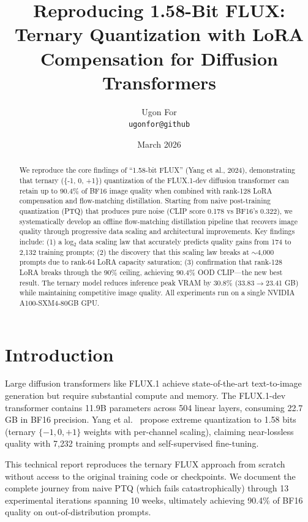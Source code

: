 \documentclass[10pt,twocolumn]{article}
\title{\textbf{Reproducing 1.58-Bit FLUX: Ternary Quantization with LoRA Compensation for Diffusion Transformers}}
\author{
  Ugon For \\
  \texttt{ugonfor@github}
}
\date{March 2026}
\begin{document}
\maketitle

\begin{abstract}
We reproduce the core findings of ``1.58-bit FLUX'' (Yang et al., 2024), demonstrating that ternary (\{-1, 0, +1\}) quantization of the FLUX.1-dev diffusion transformer can retain up to 90.4\% of BF16 image quality when combined with rank-128 LoRA compensation and flow-matching distillation.
Starting from naive post-training quantization (PTQ) that produces pure noise (CLIP score 0.178 vs BF16's 0.322), we systematically develop an offline flow-matching distillation pipeline that recovers image quality through progressive data scaling and architectural improvements.
Key findings include: (1) a log$_2$ data scaling law that accurately predicts quality gains from 174 to 2{,}132 training prompts; (2) the discovery that this scaling law breaks at $\sim$4{,}000 prompts due to rank-64 LoRA capacity saturation; (3) confirmation that rank-128 LoRA breaks through the 90\% ceiling, achieving 90.4\% OOD CLIP---the new best result.
The ternary model reduces inference peak VRAM by 30.8\% (33.83$\to$23.41 GB) while maintaining competitive image quality.
All experiments run on a single NVIDIA A100-SXM4-80GB GPU.
\end{abstract}

\section{Introduction}

Large diffusion transformers like FLUX.1 \cite{flux} achieve state-of-the-art text-to-image generation but require substantial compute and memory.
The FLUX.1-dev transformer contains 11.9B parameters across 504 linear layers, consuming 22.7 GB in BF16 precision.
Yang et al.\ \cite{yang2024} propose extreme quantization to 1.58 bits (ternary $\{-1, 0, +1\}$ weights with per-channel scaling), claiming near-lossless quality with 7{,}232 training prompts and self-supervised fine-tuning.

This technical report reproduces the ternary FLUX approach from scratch without access to the original training code or checkpoints.
We document the complete journey from naive PTQ (which fails catastrophically) through 13 experimental iterations spanning 10 weeks, ultimately achieving 90.4\% of BF16 quality on out-of-distribution prompts.
\end{document}
